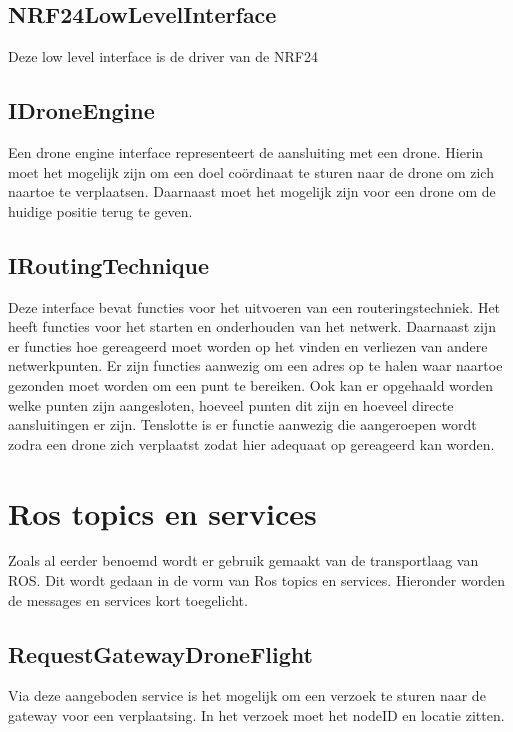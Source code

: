 \documentclass[a4paper, 11pt, oneside]{report}
\begin{document}
\subsection{NRF24LowLevelInterface}
\label{architectural:interfaces:NRF24LowLevelInterface}
Deze low level interface is de driver van de NRF24


\subsection{IDroneEngine}
\label{architectural:interfaces:IDroneEngine}
Een drone engine interface representeert de aansluiting met een drone.
Hierin moet het mogelijk zijn om een doel coördinaat te sturen naar de drone om zich naartoe te verplaatsen. 
Daarnaast moet het mogelijk zijn voor een drone om de huidige positie terug te geven.
\subsection{IRoutingTechnique}
\label{architectural:interfaces:IRoutingTechnique}
Deze interface bevat functies voor het uitvoeren van een routeringstechniek.
Het heeft functies voor het starten en onderhouden van het netwerk.
Daarnaast zijn er functies hoe gereageerd moet worden op het vinden en verliezen van andere netwerkpunten.
Er zijn functies aanwezig om een adres op te halen waar naartoe gezonden moet worden om een punt te bereiken.
Ook kan er opgehaald worden welke punten zijn aangesloten, hoeveel punten dit zijn en hoeveel directe aansluitingen er zijn.
Tenslotte is er functie aanwezig die aangeroepen wordt zodra een drone zich verplaatst zodat hier adequaat op gereageerd kan worden.

\section{Ros topics en services}
\label{architectural:ros}
Zoals al eerder benoemd wordt er gebruik gemaakt van de transportlaag van ROS. Dit wordt gedaan in de vorm van Ros topics en services. Hieronder worden de messages en services kort toegelicht.
\subsection{RequestGatewayDroneFlight}
\label{architectural:ros:service:RequestGatewayDroneFlight}
Via deze aangeboden service is het mogelijk om een verzoek te sturen naar de gateway voor een verplaatsing. In het verzoek moet het nodeID en locatie zitten.
\end{document}
